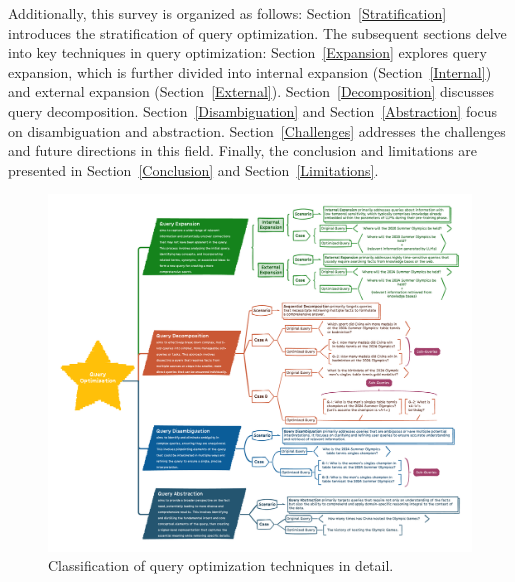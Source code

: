 \documentclass[11pt]{article}
\begin{document}
Additionally, this survey is organized as follows: Section~\ref{Stratification} introduces the stratification of query optimization. The subsequent sections delve into key techniques in query optimization: Section~\ref{Expansion} explores query expansion, which is further divided into internal expansion (Section~\ref{Internal}) and external expansion (Section~\ref{External}). Section~\ref{Decomposition} discusses query decomposition. Section~\ref{Disambiguation} and Section~\ref{Abstraction} focus on disambiguation and abstraction. Section~\ref{Challenges} addresses the challenges and future directions in this field. Finally, the conclusion and limitations are presented in Section~\ref{Conclusion} and Section~\ref{Limitations}.

\begin{figure}[h]
	\centering
	\includegraphics[scale=0.36]{figure/QueryOptimizationIntro.pdf}
	\caption{Classification of query optimization techniques in detail.}
	\label{intro_detail}
\end{figure}
\end{document}
